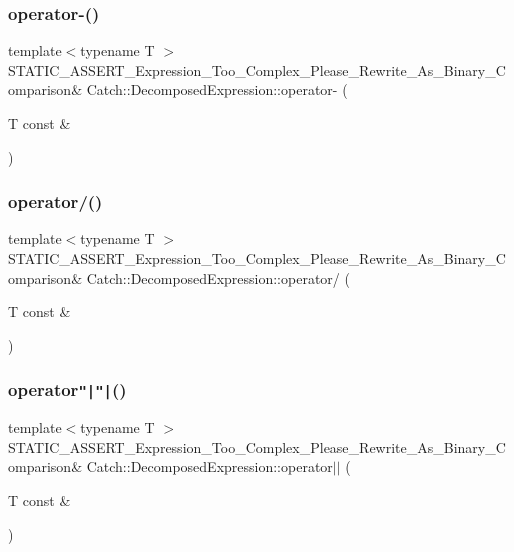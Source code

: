 \subsubsection{\texorpdfstring{operator-\/()}{operator-()}}
{\footnotesize\ttfamily template$<$typename T $>$ \\
S\+T\+A\+T\+I\+C\+\_\+\+A\+S\+S\+E\+R\+T\+\_\+\+Expression\+\_\+\+Too\+\_\+\+Complex\+\_\+\+Please\+\_\+\+Rewrite\+\_\+\+As\+\_\+\+Binary\+\_\+\+Comparison\& Catch\+::\+Decomposed\+Expression\+::operator-\/ (\begin{DoxyParamCaption}\item[{T const \&}]{ }\end{DoxyParamCaption})}

\mbox{\label{struct_catch_1_1_decomposed_expression_a519d7e2363a92106e46371c9c04044a7}} 
\subsubsection{\texorpdfstring{operator/()}{operator/()}}
{\footnotesize\ttfamily template$<$typename T $>$ \\
S\+T\+A\+T\+I\+C\+\_\+\+A\+S\+S\+E\+R\+T\+\_\+\+Expression\+\_\+\+Too\+\_\+\+Complex\+\_\+\+Please\+\_\+\+Rewrite\+\_\+\+As\+\_\+\+Binary\+\_\+\+Comparison\& Catch\+::\+Decomposed\+Expression\+::operator/ (\begin{DoxyParamCaption}\item[{T const \&}]{ }\end{DoxyParamCaption})}

\mbox{\label{struct_catch_1_1_decomposed_expression_ab4800d277290088fea9c594cfdd4f1c7}} 
\subsubsection{\texorpdfstring{operator\texttt{"|}\texttt{"|}()}{operator||()}}
{\footnotesize\ttfamily template$<$typename T $>$ \\
S\+T\+A\+T\+I\+C\+\_\+\+A\+S\+S\+E\+R\+T\+\_\+\+Expression\+\_\+\+Too\+\_\+\+Complex\+\_\+\+Please\+\_\+\+Rewrite\+\_\+\+As\+\_\+\+Binary\+\_\+\+Comparison\& Catch\+::\+Decomposed\+Expression\+::operator$\vert$$\vert$ (\begin{DoxyParamCaption}\item[{T const \&}]{ }\end{DoxyParamCaption})}

